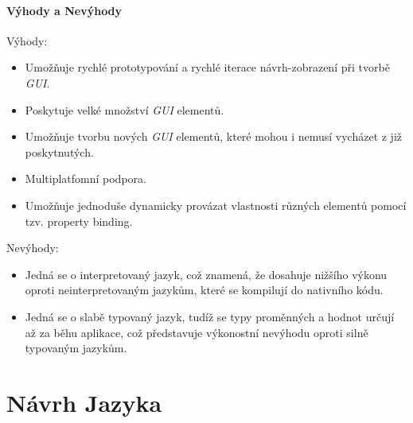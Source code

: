 \documentclass[11pt,twoside,a4paper]{book}
\begin{document}
\subsubsection{Výhody a Nevýhody}
Výhody:
\begin{itemize}
  \item Umožňuje rychlé prototypování a rychlé iterace návrh-zobrazení při tvorbě \textit{GUI}.
  \item Poskytuje velké množství \textit{GUI} elementů.
  \item Umožňuje tvorbu nových \textit{GUI} elementů, které mohou i nemusí vycházet z již poskytnutých.
  \item Multiplatfomní podpora.
  \item Umožňuje jednoduše dynamicky provázat vlastnosti různých elementů pomocí tzv. property binding.
\end{itemize}
Nevýhody:
\begin{itemize}
  \item Jedná se o interpretovaný jazyk, což znamená, že dosahuje nižšího výkonu oproti neinterpretovaným jazykům, které se kompilují do nativního kódu.
  \item Jedná se o slabě typovaný jazyk, tudíž se typy proměnných a hodnot určují až za běhu aplikace, což představuje výkonostní nevýhodu oproti silně typovaným jazykům.
\end{itemize}







\chapter{\label{CH:CQMLDes}Návrh Jazyka}
\end{document}

